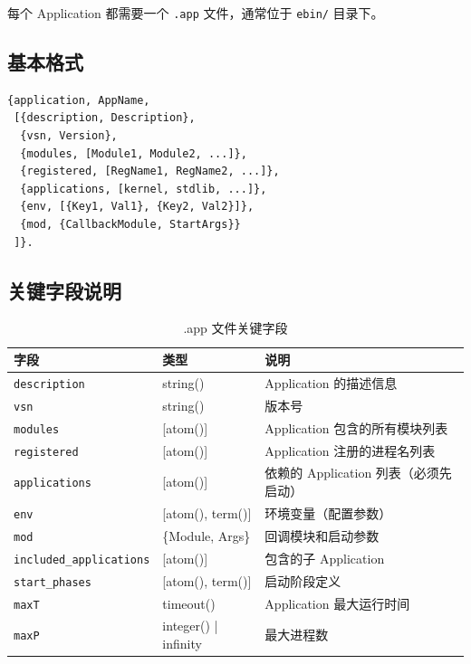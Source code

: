 \documentclass[a4paper,11pt]{article}
\begin{document}
每个 Application 都需要一个 \texttt{.app} 文件，通常位于 \texttt{ebin/} 目录下。

\subsection{基本格式}

\begin{lstlisting}[style=erlangstyle, caption={Application Resource File 基本格式}]
{application, AppName,
 [{description, Description},
  {vsn, Version},
  {modules, [Module1, Module2, ...]},
  {registered, [RegName1, RegName2, ...]},
  {applications, [kernel, stdlib, ...]},
  {env, [{Key1, Val1}, {Key2, Val2}]},
  {mod, {CallbackModule, StartArgs}}
 ]}.
\end{lstlisting}

\subsection{关键字段说明}

\begin{table}[H]
\centering
\begin{tabular}{@{}llp{7cm}@{}}
\toprule
\textbf{字段} & \textbf{类型} & \textbf{说明} \\
\midrule
\texttt{description} & string() & Application 的描述信息 \\
\texttt{vsn}         & string() & 版本号 \\
\texttt{modules}     & [atom()] & Application 包含的所有模块列表 \\
\texttt{registered}  & [atom()] & Application 注册的进程名列表 \\
\texttt{applications} & [atom()] & 依赖的 Application 列表（必须先启动） \\
\texttt{env}         & [{atom(), term()}] & 环境变量（配置参数） \\
\texttt{mod}         & \{Module, Args\} & 回调模块和启动参数 \\
\texttt{included\_applications} & [atom()] & 包含的子 Application \\
\texttt{start\_phases} & [{atom(), term()}] & 启动阶段定义 \\
\texttt{maxT}        & timeout() & Application 最大运行时间 \\
\texttt{maxP}        & integer() | infinity & 最大进程数 \\
\bottomrule
\end{tabular}
\caption{.app 文件关键字段}
\end{table}
\end{document}
